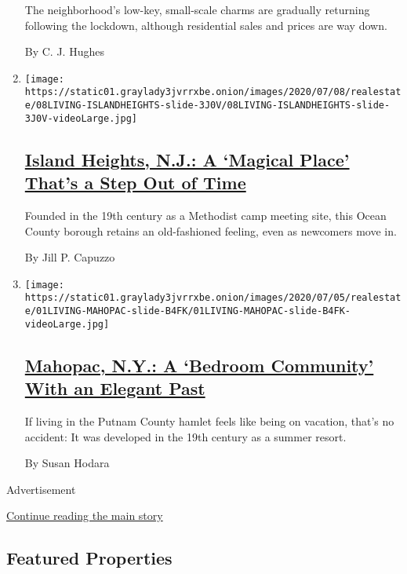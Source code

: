 \begin{enumerate}
  The neighborhood's low-key, small-scale charms are gradually returning
  following the lockdown, although residential sales and prices are way
  down.

  By C. J. Hughes
\item
  \texttt{[image: https://static01.graylady3jvrrxbe.onion/images/2020/07/08/realestate/08LIVING-ISLANDHEIGHTS-slide-3J0V/08LIVING-ISLANDHEIGHTS-slide-3J0V-videoLarge.jpg]}

  \hypertarget{island-heights-nj-a-magical-place-thats-a-step-out-of-time}{%
  \subsection{\texorpdfstring{\href{/2020/07/08/realestate/island-heights-nj-a-magical-place-thats-a-step-out-of-time.html}{Island
  Heights, N.J.: A `Magical Place' That's a Step Out of
  Time}}{Island Heights, N.J.: A `Magical Place' That's a Step Out of Time}}\label{island-heights-nj-a-magical-place-thats-a-step-out-of-time}}

  Founded in the 19th century as a Methodist camp meeting site, this
  Ocean County borough retains an old-fashioned feeling, even as
  newcomers move in.

  By Jill P. Capuzzo
\item
  \texttt{[image: https://static01.graylady3jvrrxbe.onion/images/2020/07/05/realestate/01LIVING-MAHOPAC-slide-B4FK/01LIVING-MAHOPAC-slide-B4FK-videoLarge.jpg]}

  \hypertarget{mahopac-ny-a-bedroom-community-with-an-elegant-past}{%
  \subsection{\texorpdfstring{\href{/2020/07/01/realestate/mahopac-ny-a-bedroom-community-with-an-elegant-past.html}{Mahopac,
  N.Y.: A `Bedroom Community' With an Elegant
  Past}}{Mahopac, N.Y.: A `Bedroom Community' With an Elegant Past}}\label{mahopac-ny-a-bedroom-community-with-an-elegant-past}}

  If living in the Putnam County hamlet feels like being on vacation,
  that's no accident: It was developed in the 19th century as a summer
  resort.

  By Susan Hodara
\end{enumerate}

Advertisement

\protect\hyperlink{after-mid2}{Continue reading the main story}

\hypertarget{featured-properties}{%
\subsection{Featured Properties}\label{featured-properties}}

